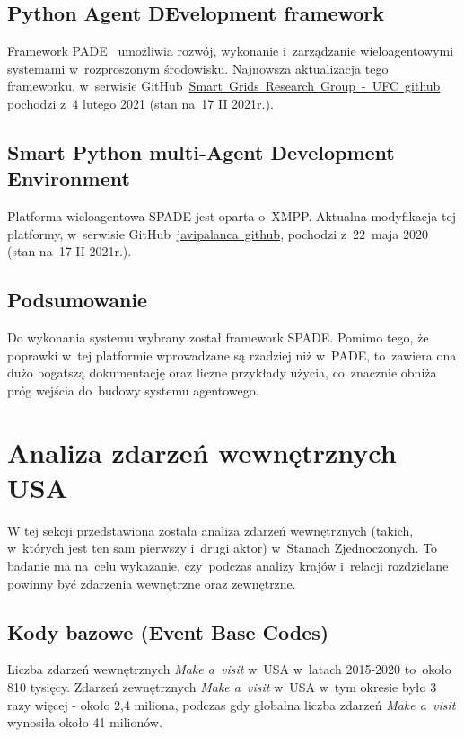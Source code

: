 \documentclass[11pt]{report}
\begin{document}
    \subsection{Python Agent DEvelopment framework}
    Framework PADE~\cite{Melo2019} umożliwia rozwój, wykonanie i~zarządzanie wieloagentowymi systemami w~rozproszonym środowisku.
    Najnowsza aktualizacja tego frameworku, w~serwisie GitHub~\href{https://github.com/grei-ufc/pade}{Smart~Grids~Research~Group~-~UFC~github} pochodzi z~4 lutego 2021 (stan na~17 II 2021r.).

    \subsection{Smart Python multi-Agent Development Environment}
    Platforma wieloagentowa SPADE jest oparta o~XMPP\cite{Saint-Andre2007}.
    Aktualna modyfikacja tej platformy, w~serwisie GitHub~\href{https://github.com/javipalanca/spade}{javipalanca~github}, pochodzi z~22~maja 2020 (stan na~17 II 2021r.).
    \enlargethispage{1\baselineskip}

    \subsection{Podsumowanie}
    Do wykonania systemu wybrany został framework SPADE\@.
    Pomimo tego, że poprawki w~tej platformie wprowadzane są rzadziej niż w~PADE, to~zawiera ona dużo bogatszą dokumentację
    oraz liczne przykłady użycia, co~znacznie obniża próg wejścia do~budowy systemu agentowego.


    \section{Analiza zdarzeń wewnętrznych USA}
    W tej sekcji przedstawiona została analiza zdarzeń wewnętrznych (takich, w~których jest ten sam pierwszy i~drugi aktor) w~Stanach Zjednoczonych.
    To badanie ma na~celu wykazanie, czy~podczas analizy krajów i~relacji rozdzielane powinny być zdarzenia wewnętrzne oraz zewnętrzne.

    \subsection{Kody bazowe (Event Base Codes)}\label{subsec:kody-bazowenullevent-base-codesnull}

    Liczba zdarzeń wewnętrznych \textit{Make a~visit} w~USA w~latach 2015-2020 to~około 810 tysięcy.
    Zdarzeń zewnętrznych \textit{Make a~visit} w~USA w~tym okresie było 3 razy więcej - około 2,4 miliona,
    podczas gdy globalna liczba zdarzeń \textit{Make a~visit} wynosiła około 41 milionów.
\end{document}

